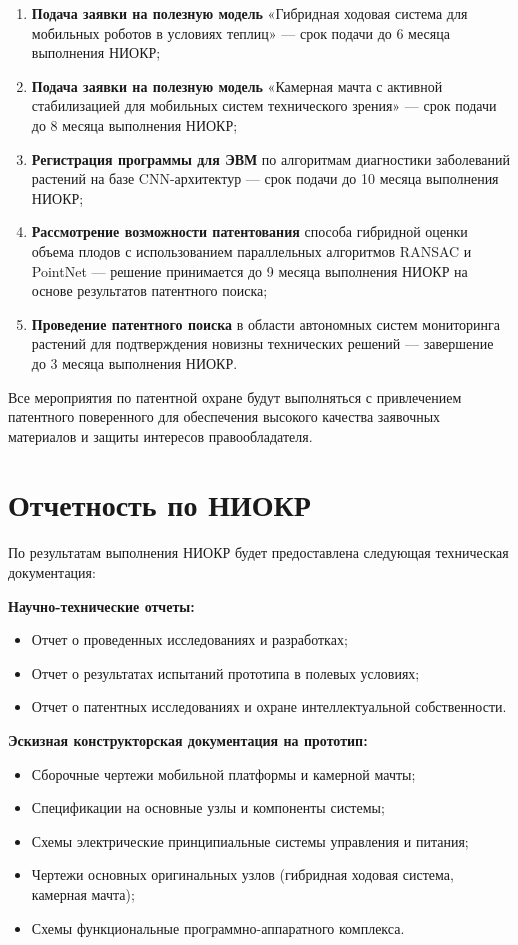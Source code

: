 \documentclass[12pt,a4paper]{article}
\begin{document}
\begin{enumerate}
\item \textbf{Подача заявки на полезную модель} «Гибридная ходовая система для мобильных роботов в условиях теплиц» — срок подачи до 6 месяца выполнения НИОКР;

\item \textbf{Подача заявки на полезную модель} «Камерная мачта с активной стабилизацией для мобильных систем технического зрения» — срок подачи до 8 месяца выполнения НИОКР;

\item \textbf{Регистрация программы для ЭВМ} по алгоритмам диагностики заболеваний растений на базе CNN-архитектур — срок подачи до 10 месяца выполнения НИОКР;

\item \textbf{Рассмотрение возможности патентования} способа гибридной оценки объема плодов с использованием параллельных алгоритмов RANSAC и PointNet — решение принимается до 9 месяца выполнения НИОКР на основе результатов патентного поиска;

\item \textbf{Проведение патентного поиска} в области автономных систем мониторинга растений для подтверждения новизны технических решений — завершение до 3 месяца выполнения НИОКР.
\end{enumerate}

Все мероприятия по патентной охране будут выполняться с привлечением патентного поверенного для обеспечения высокого качества заявочных материалов и защиты интересов правообладателя.

\section{Отчетность по НИОКР}

По результатам выполнения НИОКР будет предоставлена следующая техническая документация:

\textbf{Научно-технические отчеты:}
\begin{itemize}
\item Отчет о проведенных исследованиях и разработках;
\item Отчет о результатах испытаний прототипа в полевых условиях;
\item Отчет о патентных исследованиях и охране интеллектуальной собственности.
\end{itemize}

\textbf{Эскизная конструкторская документация на прототип:}
\begin{itemize}
\item Сборочные чертежи мобильной платформы и камерной мачты;
\item Спецификации на основные узлы и компоненты системы;
\item Схемы электрические принципиальные системы управления и питания;
\item Чертежи основных оригинальных узлов (гибридная ходовая система, камерная мачта);
\item Схемы функциональные программно-аппаратного комплекса.
\end{itemize}
\end{document}
